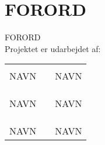 \chapter*{FORORD}

FORORD\\

Projektet er udarbejdet af:\\
%
\begin{table}[H]
	\centering
		\begin{tabular}{c c c}
			\underline{\phantom{JAERJAERJAERJAERGO}} & \phantom{cookies} & \underline{\phantom{JAERJAERJAERJAERGO}} \\
			NAVN			& \phantom{cookies} & NAVN		\\
			&&\\
			&&\\
			\underline{\phantom{JAERJAERJAERJAERGO}} & \phantom{cookies} & \underline{\phantom{JAERJAERJAERJAERGO}} \\
			NAVN			& \phantom{cookies} & NAVN		\\
			&&\\
			&&\\
	    \underline{\phantom{JAERJAERJAERJAERGO}} & \phantom{cookies} & \underline{\phantom{JAERJAERJAERJAERGO}} \\
			NAVN 					& \phantom{cookies} & NAVN 			\\			
		\end{tabular}
\end{table}